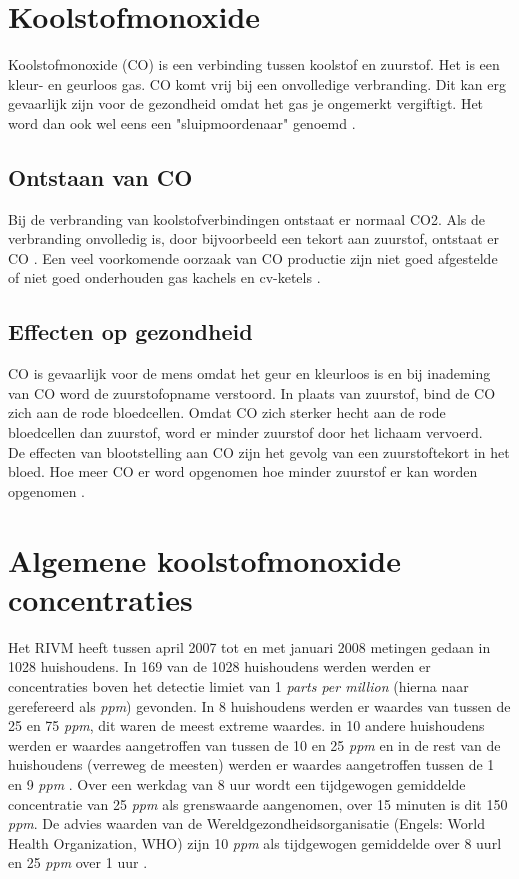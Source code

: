 \documentclass[a4paper, 11pt]{article} %
\begin{document}
	\section{Koolstofmonoxide} \label{sec::CO}
	Koolstofmonoxide (CO) is een verbinding tussen koolstof en zuurstof. Het is een kleur- en geurloos gas. CO komt vrij bij een onvolledige verbranding. Dit kan erg gevaarlijk zijn voor de gezondheid omdat het gas je ongemerkt vergiftigt. Het word dan ook wel eens een "sluipmoordenaar" genoemd \cite{Effecten Koolmonoxide}. 
	
	\subsection{Ontstaan van CO} \label{subsec::ontstaan_CO}
	Bij de verbranding van koolstofverbindingen ontstaat er normaal CO2. Als de verbranding onvolledig is, door bijvoorbeeld een tekort aan zuurstof, ontstaat er CO \cite{Effecten Koolmonoxide}. Een veel voorkomende oorzaak van CO productie zijn niet goed afgestelde of niet goed onderhouden gas kachels en cv-ketels \cite{RIVM huurwoningen}.
	
	\subsection{Effecten op gezondheid} \label{subsec::CO_gezondheid}
	CO is gevaarlijk voor de mens omdat het geur en kleurloos is en bij inademing van CO word de zuurstofopname verstoord. In plaats van zuurstof, bind de CO zich aan de rode bloedcellen. Omdat CO zich sterker hecht aan de rode bloedcellen dan zuurstof, word er minder zuurstof door het lichaam vervoerd. 
	\\
	De effecten van blootstelling aan CO zijn het gevolg van een zuurstoftekort in het bloed. Hoe meer CO er word opgenomen hoe minder zuurstof er kan worden opgenomen \cite{Effecten Koolmonoxide}. 
	
	\section{Algemene koolstofmonoxide concentraties} \label{sec::CO_concentraties}
	Het RIVM heeft tussen april 2007 tot en met januari 2008 metingen gedaan in 1028 huishoudens. In 169 van de 1028 huishoudens werden werden er concentraties boven het detectie limiet van 1 \textit{parts per million} (hierna naar gerefereerd als \textit{ppm}) gevonden. In 8 huishoudens werden er waardes van tussen de 25 en 75 \textit{ppm}, dit waren de meest extreme waardes. in 10 andere huishoudens werden er waardes aangetroffen van tussen de 10 en 25 \textit{ppm} en in de rest van de huishoudens (verreweg de meesten) werden er waardes aangetroffen tussen de 1 en 9 \textit{ppm} \cite{RIVM huurwoningen}. Over een werkdag van 8 uur wordt een tijdgewogen gemiddelde concentratie van 25 \textit{ppm} als grenswaarde aangenomen, over 15 minuten is dit 150 \textit{ppm}. De advies waarden van de Wereldgezondheidsorganisatie (Engels: World Health Organization, WHO) zijn 10 \textit{ppm} als tijdgewogen gemiddelde over 8 uurl en 25 \textit{ppm} over 1 uur \cite{Blootstelling aan CO}.
	
\end{document}
